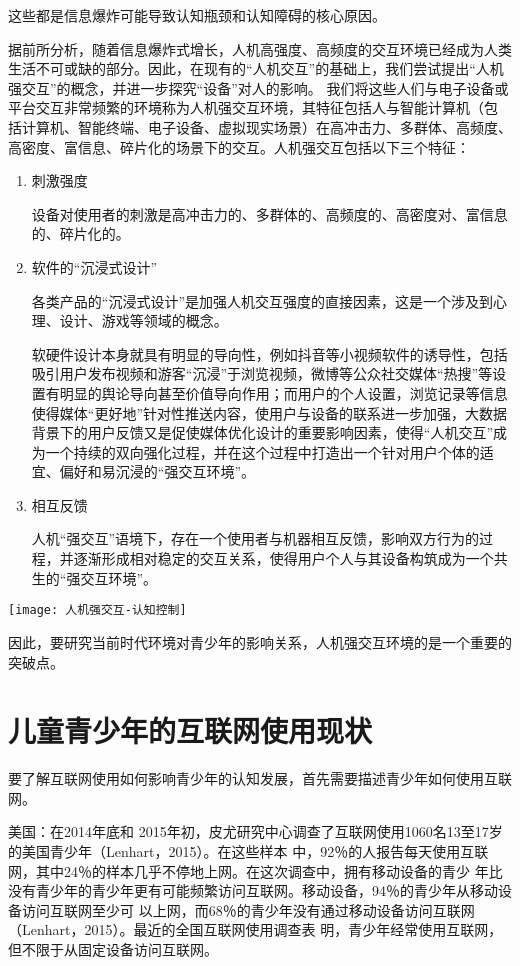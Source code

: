 这些都是信息爆炸可能导致认知瓶颈和认知障碍的核心原因。

据前所分析，随着信息爆炸式增长，人机高强度、高频度的交互环境已经成为人类生活不可或缺的部分。因此，在现有的“人机交互”的基础上，我们尝试提出“人机强交互”的概念，并进一步探究“设备”对人的影响。
我们将这些人们与电子设备或平台交互非常频繁的环境称为人机强交互环境，其特征包括人与智能计算机（包
括计算机、智能终端、电子设备、虚拟现实场景）在高冲击力、多群体、高频度、高密度、富信息、碎片化的场景下的交互。人机强交互包括以下三个特征：
\begin{enumerate}
\item 刺激强度

	设备对使用者的刺激是高冲击力的、多群体的、高频度的、高密度对、富信息的、碎片化的。
	
\item 软件的“沉浸式设计”

	各类产品的“沉浸式设计”是加强人机交互强度的直接因素，这是一个涉及到心理、设计、游戏等领域的概念。


软硬件设计本身就具有明显的导向性，例如抖音等小视频软件的诱导性，包括吸引用户发布视频和游客“沉浸”于浏览视频，微博等公众社交媒体“热搜”等设置有明显的舆论导向甚至价值导向作用；而用户的个人设置，浏览记录等信息使得媒体“更好地”针对性推送内容，使用户与设备的联系进一步加强，大数据背景下的用户反馈又是促使媒体优化设计的重要影响因素，使得“人机交互”成为一个持续的双向强化过程，并在这个过程中打造出一个针对用户个体的适宜、偏好和易沉浸的“强交互环境”。


\item 相互反馈


人机“强交互”语境下，存在一个使用者与机器相互反馈，影响双方行为的过程，并逐渐形成相对稳定的交互关系，使得用户个人与其设备构筑成为一个共生的“强交互环境”。
\end{enumerate}

\texttt{[image: 人机强交互-认知控制]}



因此，要研究当前时代环境对青少年的影响关系，人机强交互环境的是一个重要的突破点。

\section{儿童青少年的互联网使用现状}

要了解互联网使用如何影响青少年的认知发展，首先需要描述青少年如何使用互联网。

美国：在2014年底和
2015年初，皮尤研究中心调查了互联网使用1060名13至17岁的美国青少年（Lenhart，2015）。在这些样本
中，92％的人报告每天使用互联网，其中24％的样本几乎不停地上网。在这次调查中，拥有移动设备的青少
年比没有青少年的青少年更有可能频繁访问互联网。移动设备，94％的青少年从移动设备访问互联网至少可
以上网，而68％的青少年没有通过移动设备访问互联网（Lenhart，2015）。最近的全国互联网使用调查表
明，青少年经常使用互联网，但不限于从固定设备访问互联网。

